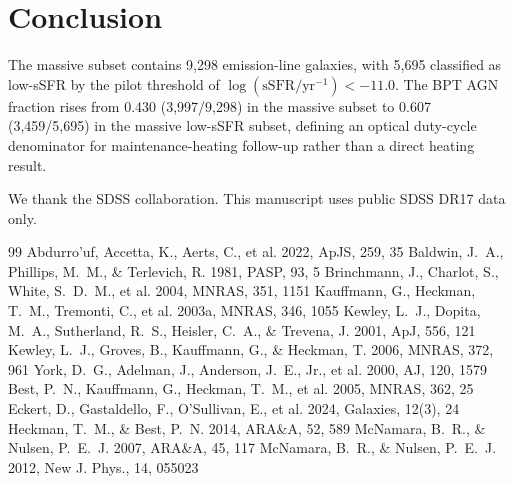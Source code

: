 \documentclass[twocolumn]{aastex702}
\begin{document}
\section{Conclusion}\label{sec:conclusion}
The massive subset contains 9,298 emission-line galaxies, with 5,695 classified as low-sSFR by the pilot threshold of $\log(\mathrm{sSFR}/\mathrm{yr}^{-1}) < -11.0$. The BPT AGN fraction rises from 0.430 (3,997/9,298) in the massive subset to 0.607 (3,459/5,695) in the massive low-sSFR subset, defining an optical duty-cycle denominator for maintenance-heating follow-up rather than a direct heating result.

\begin{acknowledgments}
We thank the SDSS collaboration. This manuscript uses public SDSS DR17 data only.
\end{acknowledgments}
\begin{thebibliography}{99}
 Abdurro'uf, Accetta, K., Aerts, C., et al. 2022, ApJS, 259, 35
 Baldwin, J.~A., Phillips, M.~M., \& Terlevich, R. 1981, PASP, 93, 5
 Brinchmann, J., Charlot, S., White, S.~D.~M., et al. 2004, MNRAS, 351, 1151
 Kauffmann, G., Heckman, T.~M., Tremonti, C., et al. 2003a, MNRAS, 346, 1055
 Kewley, L.~J., Dopita, M.~A., Sutherland, R.~S., Heisler, C.~A., \& Trevena, J. 2001, ApJ, 556, 121
 Kewley, L.~J., Groves, B., Kauffmann, G., \& Heckman, T. 2006, MNRAS, 372, 961
 York, D.~G., Adelman, J., Anderson, J.~E., Jr., et al. 2000, AJ, 120, 1579
 Best, P.~N., Kauffmann, G., Heckman, T.~M., et al. 2005, MNRAS, 362, 25
 Eckert, D., Gastaldello, F., O'Sullivan, E., et al. 2024, Galaxies, 12(3), 24
 Heckman, T.~M., \& Best, P.~N. 2014, ARA\&A, 52, 589
 McNamara, B.~R., \& Nulsen, P.~E.~J. 2007, ARA\&A, 45, 117
 McNamara, B.~R., \& Nulsen, P.~E.~J. 2012, New J. Phys., 14, 055023
\end{thebibliography}
\end{document}
